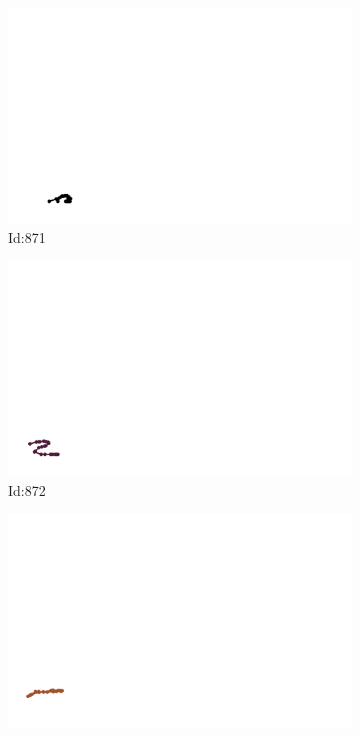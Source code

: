\documentclass[12pt,twoside]{report}
\begin{document}
\begin{figure}
\centering
\begin{subfigure}[b]{0.20\textwidth}
\centering
\includegraphics[width=\textwidth]{../../trajectories/871.png}
\caption{Id:871}
\end{subfigure}
\begin{subfigure}[b]{0.20\textwidth}
\centering
\includegraphics[width=\textwidth]{../../trajectories/872.png}
\caption{Id:872}
\end{subfigure}
\begin{subfigure}[b]{0.20\textwidth}
\centering
\includegraphics[width=\textwidth]{../../trajectories/873.png}

\end{subfigure}
\end{figure}
\end{document}
